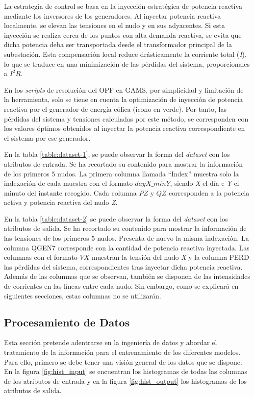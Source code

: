 La estrategia de control se basa en la inyección estratégica de potencia reactiva mediante los inversores de los generadores. Al inyectar potencia reactiva localmente, se elevan las tensiones en el nudo y en sus adyacentes. Si esta inyección se realiza cerca de los puntos con alta demanda reactiva, se evita que dicha potencia deba ser transportada desde el transformador principal de la subestación. Esta compensación local reduce drásticamente la corriente total (\textit{I}), lo que se traduce en una minimización de las pérdidas del sistema, proporcionales a $I^2R$.

En los \textit{scripts} de resolución del OPF en GAMS, por simplicidad y limitación de la herramienta, solo se tiene en cuenta la optimización de inyección de potencia reactiva por el generador de energía eólica (icono en verde). Por tanto, las pérdidas del sistema y tensiones calculadas por este método, se corresponden con los valores óptimos obtenidos al inyectar la potencia reactiva correspondiente en el sistema por ese generador.

En la tabla \ref{table:dataset-1}, se puede observar la forma del \textit{dataset} con los atributos de entrada. Se ha recortado su contenido para mostrar la información de los primeros 5 nudos. La primera columna llamada ``Index'' muestra solo la indexación de cada muestra con el formato $dayX\_minY$, siendo \textit{X} el día e \textit{Y} el minuto del instante recogido. Cada columna $PZ$ y $QZ$ corresponden a la potencia activa y potencia reactiva del nudo \textit{Z}.



En la tabla \ref{table:dataset-2} se puede observar la forma del \textit{dataset} con los atributos de salida. Se ha recortado su contenido para mostrar la información de las tensiones de los primeros 5 nudos. Presenta de nuevo la misma indexación. La columna QGEN7 corresponde con la cantidad de potencia reactiva inyectada. Las columnas con el formato $VX$ muestran la tensión del nudo \textit{X} y la columna PERD las pérdidas del sistema, correspondientes tras inyectar dicha potencia reactiva. Además de las columnas que se observan, también se disponen de las intensidades de corrientes en las líneas entre cada nudo. Sin embargo, como se explicará en siguientes secciones, estas columnas no se utilizarán.
\clearpage



\subsection{Procesamiento de Datos}
Esta sección pretende adentrarse en la ingeniería de datos y abordar el tratamiento de la información para el entrenamiento de los diferentes modelos. Para ello, primero se debe tener una visión general de los datos que se dispone. En la figura \ref{fig:hist_input} se encuentran los histogramas de todas las columnas de los atributos de entrada y en la figura \ref{fig:hist_output} los histogramas de los atributos de salida.

